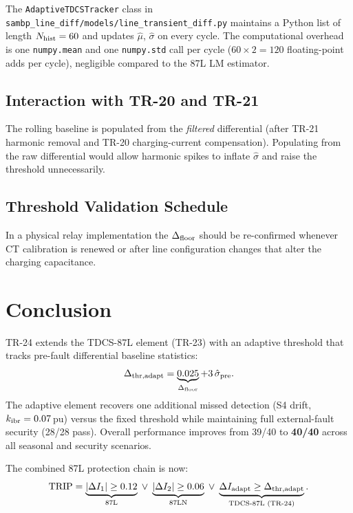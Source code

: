 \documentclass[11pt,a4paper]{article}
\begin{document}
The \texttt{AdaptiveTDCSTracker} class in
\texttt{sambp\_line\_diff/models/line\_transient\_diff.py} maintains a
Python list of length $N_{\rm hist}=60$ and updates $\hat{\mu}$,
$\hat{\sigma}$ on every cycle.  The computational overhead is one
\texttt{numpy.mean} and one \texttt{numpy.std} call per cycle
($60 \times 2 = 120$ floating-point adds per cycle), negligible compared
to the 87L LM estimator.

\subsection{Interaction with TR-20 and TR-21}

The rolling baseline is populated from the \emph{filtered} differential
(after TR-21 harmonic removal and TR-20 charging-current compensation).
Populating from the raw differential would allow harmonic spikes to inflate
$\hat{\sigma}$ and raise the threshold unnecessarily.

\subsection{Threshold Validation Schedule}

In a physical relay implementation the $\Delta_{\rm floor}$ should be
re-confirmed whenever CT calibration is renewed or after line configuration
changes that alter the charging capacitance.

\section{Conclusion}

TR-24 extends the TDCS-87L element (TR-23) with an adaptive threshold that
tracks pre-fault differential baseline statistics:
\begin{equation}
  \Delta_{\rm thr,adapt} = \underbrace{0.025}_{\Delta_{\rm floor}}
    + 3\,\hat{\sigma}_{\rm pre}.
\end{equation}
The adaptive element recovers one additional missed detection (S4 drift,
$k_{\rm ibr}=0.07$\,pu) versus the fixed threshold while maintaining full
external-fault security (28/28 pass).  Overall performance improves from
39/40 to \textbf{40/40} across all seasonal and security scenarios.

The combined 87L protection chain is now:
\begin{equation}
  \text{TRIP} = \underbrace{|{\Delta I_1}| \geq 0.12}_{\text{87L}}
    \;\vee\;
    \underbrace{|{\Delta I_2}| \geq 0.06}_{\text{87LN}}
    \;\vee\;
    \underbrace{\Delta I_{\rm adapt} \geq \Delta_{\rm thr,adapt}}_{\text{TDCS-87L (TR-24)}}.
\end{equation}
\end{document}
